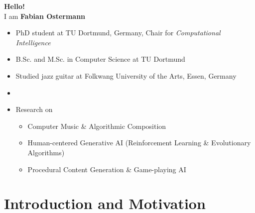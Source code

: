 
\newcommand{\HIDE}[1]{}

\begin{frame}
	\centering
	{\color{TUDoGreen} \huge\textbf{Hello!}}\\
	\medskip
	\Large I am \textbf{Fabian Ostermann}
	
	\bigskip
	\begin{itemize}\setlength\itemsep{4pt}
		\normalsize
		\item PhD student at TU Dortmund, Germany, Chair for \emph{Computational Intelligence}\\
		\item B.Sc. and M.Sc. in Computer Science at TU Dortmund\\
		\item Studied jazz guitar at Folkwang University of the Arts, Essen, Germany
		\item[]
		\item[] Research on
		\begin{itemize}\setlength\itemsep{2pt}
			\item Computer Music \& Algorithmic Composition
			\item Human-centered Generative AI (Reinforcement Learning \& Evolutionary Algorithms)
			\item Procedural Content Generation \& Game-playing AI
		\end{itemize}
	\end{itemize}
\end{frame}

\section{Introduction and Motivation}

